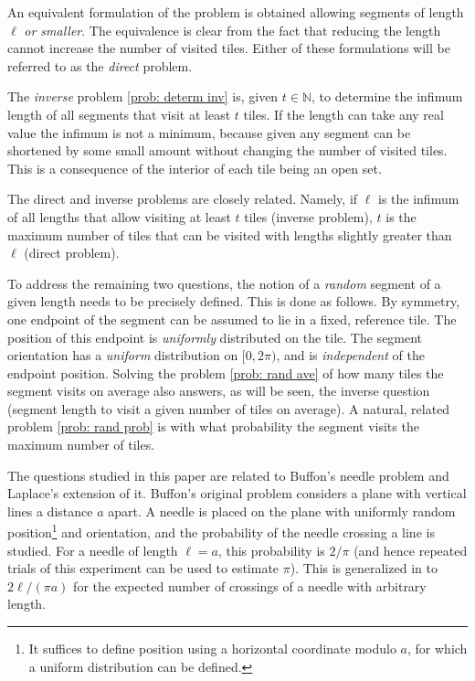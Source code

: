 \documentclass[12pt, a4paper]{article}
\newcommand{\len}{\ell} %
\newcommand{\tiles}{t} %
\begin{document}
An equivalent formulation of the problem is obtained allowing segments of length $\len$ \emph{or smaller}. The equivalence is clear from the fact that reducing the length cannot increase the number of visited tiles. Either of these formulations will be referred to as the \emph{direct} problem.

The \emph{inverse} problem \ref{prob: determ inv} is, given $\tiles \in \mathbb N$, to determine the infimum length of all segments that visit at least $\tiles$ tiles. If the length can take any real value the infimum is not a minimum, because given any segment can be shortened by some small amount without changing the number of visited tiles. This is a consequence of the interior of each tile being an open set.

The direct and inverse problems are closely related. Namely, if $\len$ is the infimum of all lengths that allow visiting at least $\tiles$ tiles (inverse problem), $\tiles$ is the maximum number of tiles that can be visited with lengths slightly greater than $\len$ (direct problem).

To address the remaining two questions, the notion of a \emph{random} segment of a given length needs to be precisely defined. This is done as follows. By symmetry, one endpoint of the segment can be assumed to lie in a fixed, reference tile. The position of this endpoint is \emph{uniformly} distributed on the tile. The segment orientation has a \emph{uniform} distribution on $[0,2\pi)$, and is \emph{independent} of the endpoint position. Solving the problem \ref{prob: rand ave} of how many tiles the segment visits on average also answers, as will be seen, the inverse question (segment length to visit a given number of tiles on average). A natural, related problem \ref{prob: rand prob} is with what probability the segment visits the maximum number of tiles. 


The questions studied in this paper are related to Buffon's needle problem and Laplace's extension of it. Buffon's original problem considers a plane with vertical lines a distance $a$ apart. A needle is placed on the plane with uniformly random position\footnote{It suffices to define position using a horizontal coordinate modulo $a$, for which a uniform distribution can be defined.} and orientation, and the probability of the needle crossing a line is studied. For a needle of length $\len = a$, this probability is $2/\pi$ (and hence repeated trials of this experiment can be used to estimate $\pi$). This is generalized in \cite{Ramaley69} to $2\len /(\pi a)$ for the expected number of crossings of a needle with arbitrary length.
\end{document}
